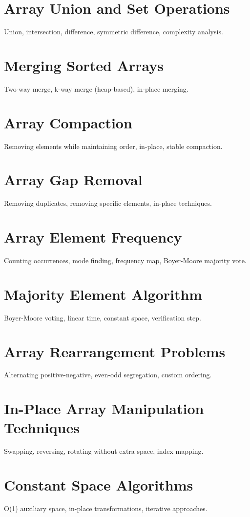 \chapter{Array Union and Set Operations}
Union, intersection, difference, symmetric difference, complexity analysis.

\chapter{Merging Sorted Arrays}
Two-way merge, k-way merge (heap-based), in-place merging.

\chapter{Array Compaction}
Removing elements while maintaining order, in-place, stable compaction.

\chapter{Array Gap Removal}
Removing duplicates, removing specific elements, in-place techniques.

\chapter{Array Element Frequency}
Counting occurrences, mode finding, frequency map, Boyer-Moore majority vote.

\chapter{Majority Element Algorithm}
Boyer-Moore voting, linear time, constant space, verification step.

\chapter{Array Rearrangement Problems}
Alternating positive-negative, even-odd segregation, custom ordering.

\chapter{In-Place Array Manipulation Techniques}
Swapping, reversing, rotating without extra space, index mapping.

\chapter{Constant Space Algorithms}
O(1) auxiliary space, in-place transformations, iterative approaches.

